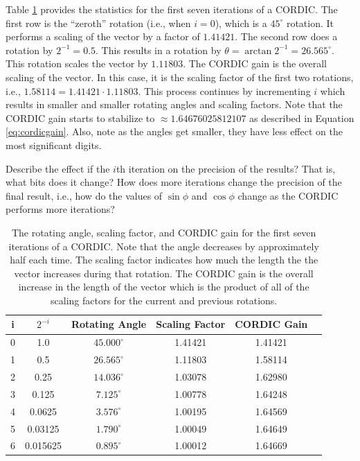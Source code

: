 Table \ref{table:cordic} provides the statistics for the first seven iterations of a CORDIC. The first row is the ``zeroth'' rotation (i.e., when $i=0$), which is a $45^{\circ}$ rotation. It performs a scaling of the vector by a factor of $1.41421$. The second row does a rotation by $2^{-1} = 0.5$. This results in a rotation by $\theta = \arctan 2^{-1} = 26.565^{\circ}$. This rotation scales the vector by $1.11803$. The CORDIC gain is the overall scaling of the vector. In this case, it is the scaling factor of the first two rotations, i.e., $1.58114 = 1.41421 \cdot 1.11803$. This process continues by incrementing $i$ which results in smaller and smaller rotating angles and scaling factors. Note that the CORDIC gain starts to stabilize to $\approx 1.64676025812107$ as described in Equation \ref{eq:cordicgain}. Also, note as the angles get smaller, they have less effect on the most significant digits. 

\begin{exercise}
Describe the effect if the $i$th iteration on the precision of the results? That is, what bits does it change? How does more iterations change the precision of the final result, i.e., how do the values of $\sin \phi$ and $\cos \phi$ change as the CORDIC performs more iterations?
\end{exercise}



\begin{table}[htbp]
\caption{The rotating angle, scaling factor, and CORDIC gain for the first seven iterations of a CORDIC. Note that the angle decreases by approximately half each time. The scaling factor indicates how much the length the the vector increases during that rotation. The CORDIC gain is the overall increase in the length of the vector which is the product of all of the scaling factors for the current and previous rotations.}
\begin{center}
\begin{tabular}{|c|c|c|c|c|c|}
\hline
i & $2^{-i}$ 	& Rotating Angle  	& Scaling Factor 	& CORDIC Gain 	\\ \hline \hline
0 & 1.0 		& $45.000^{\circ}$	& 1.41421			& 1.41421		\\ \hline
1 & 0.5 		& $26.565^{\circ}$	& 1.11803			& 1.58114		\\ \hline
2 & 0.25 		& $14.036^{\circ}$	& 1.03078			& 1.62980		\\ \hline
3 & 0.125 		& $7.125^{\circ}$	& 1.00778			& 1.64248		\\ \hline
4 & 0.0625 	& $3.576^{\circ}$	& 1.00195			& 1.64569		\\ \hline
5 & 0.03125 	& $1.790^{\circ}$	& 1.00049			& 1.64649		\\ \hline
6 & 0.015625 	& $0.895^{\circ}$	& 1.00012			& 1.64669		\\ \hline
\end{tabular}
\end{center}
\label{table:cordic}
\end{table}%

